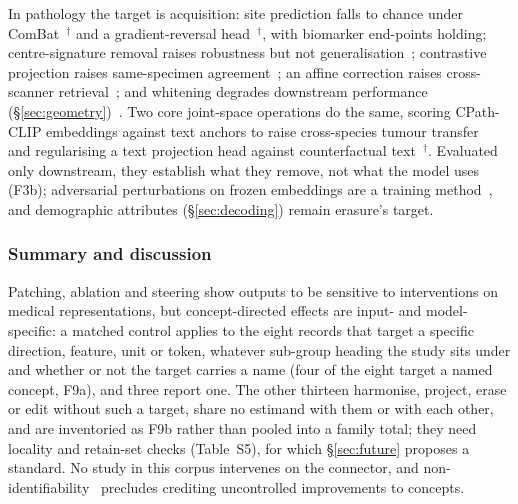 In pathology the target is acquisition: site prediction falls to chance under
ComBat~\cite{murchan2024deep}$^{\dagger}$ and a gradient-reversal
head~\cite{zhang2025hospital}$^{\dagger}$, with biomarker end-points holding; centre-signature
removal raises robustness but not generalisation~\cite{kmen2026robust}; contrastive projection
raises same-specimen agreement~\cite{carloni2025pathology}; an affine correction raises
cross-scanner retrieval~\cite{donle2026featmap}; and whitening degrades downstream performance
(\S\ref{sec:geometry})~\cite{garciahidalgo2026embedding}. Two core joint-space operations do the
same, scoring CPath-CLIP embeddings against text anchors to raise cross-species tumour
transfer~\cite{arora2026semantic} and regularising a text projection head against counterfactual
text~\cite{balogh2026regularization}$^{\dagger}$. Evaluated only downstream, they establish what
they remove, not what the model uses (F3b); adversarial perturbations on frozen embeddings are a
training method~\cite{xu2024apple}, and demographic attributes (\S\ref{sec:decoding}) remain
erasure's target.


\subsubsection{Summary and discussion}

Patching, ablation and steering show outputs to be sensitive to interventions on medical representations,
but concept-directed effects are input- and model-specific: a matched control applies to the eight records that target a specific direction, feature, unit or token,
whatever sub-group heading the study sits under and whether or not the target carries a name (four of the eight target a named concept, F9a), and three report one. The other thirteen harmonise, project, erase or edit
without such a target, share no estimand with them or with each other, and are inventoried as F9b rather than
pooled into a family total; they need locality and retain-set checks (Table~S5), for which
\S\ref{sec:future} proposes a standard. No study in this corpus intervenes on the connector, and
non-identifiability~\cite{korznikov2025the,venkatesh2026nonident} precludes crediting uncontrolled
improvements to concepts.
